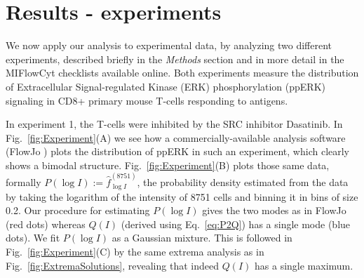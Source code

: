 \documentclass[11pt,a4paper,draft]{article}
\begin{document}
\section*{Results - experiments}

We now apply our analysis to experimental data, by analyzing two different experiments, described briefly in the \emph{Methods} section and in more detail in the MIFlowCyt checklists available online. Both experiments measure the distribution of Extracellular Signal-regulated Kinase (ERK) phosphorylation (ppERK) signaling in CD8+ primary mouse T-cells responding to antigens. 

\smallskip
In experiment 1, the T-cells were inhibited by the SRC inhibitor Dasatinib. In Fig.~\ref{fig:Experiment}(A) we see how a commercially-available analysis software (FlowJo \cite{FlowJo}) plots the distribution of ppERK in such an experiment, which clearly shows a bimodal structure. Fig.~\ref{fig:Experiment}(B) plots those same data, formally $P(\log I) := \hat{f}_{\log I}^{(8751)}$, the probability density estimated from the data by taking the logarithm of the intensity of 8751 cells and binning it in bins of size 0.2. Our procedure for estimating $P(\log I)$ gives the two modes as in FlowJo (red dots) whereas $Q(I)$ (derived using Eq.~\ref{eq:P2Q}) has a single mode (blue dots). We fit $P(\log I)$ as a Gaussian mixture. This is followed in Fig.~\ref{fig:Experiment}(C) by the same extrema analysis as in Fig.~\ref{fig:ExtremaSolutions}, revealing that indeed $Q(I)$ has a single maximum.
\smallskip
\end{document}
